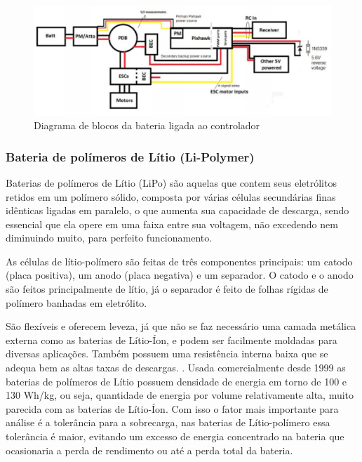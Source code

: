 \begin{figure}[h!]
    \centering
	\includegraphics[keepaspectratio=true,scale=0.6]{figuras/esquemabateria.eps}
    \caption{Diagrama de blocos da bateria ligada ao controlador}
    \label{fig:esquemabateria}
\end{figure}


\subsubsection{Bateria de polímeros de Lítio (Li-Polymer)}

Baterias de polímeros de Lítio (LiPo) são aquelas que contem seus eletrólitos retidos em um polímero sólido, 
composta por várias células secundárias finas idênticas ligadas em paralelo, o que aumenta sua capacidade de 
descarga, sendo essencial que ela opere em uma faixa entre sua voltagem, não excedendo nem diminuindo muito, para perfeito funcionamento. \cite{gibbs}

As células de lítio-polímero são feitas de três componentes principais: um catodo (placa positiva), um anodo 
(placa negativa) e um separador. O catodo e o anodo são feitos principalmente de lítio, já o separador é feito 
de folhas rígidas de polímero banhadas em eletrólito. \cite{gibbs}

São flexíveis e oferecem leveza, já que não se faz necessário uma camada metálica externa como as baterias de 
Lítio-Íon, e podem ser facilmente moldadas para diversas aplicações. Também possuem uma resistência interna 
baixa que se adequa bem as altas taxas de descargas. \cite{costa}. Usada comercialmente desde 1999 as baterias 
de polímeros de Lítio possuem densidade de energia em torno de 100 e 130 Wh/kg, ou seja, quantidade de energia 
por volume relativamente alta, muito parecida com as baterias de Lítio-Íon. Com isso o fator mais importante para
análise é a tolerância para a sobrecarga, nas baterias de Lítio-polímero essa tolerância é maior, evitando um 
excesso de energia concentrado na bateria que ocasionaria a perda de rendimento ou até a perda total da bateria.
\cite{costa}

